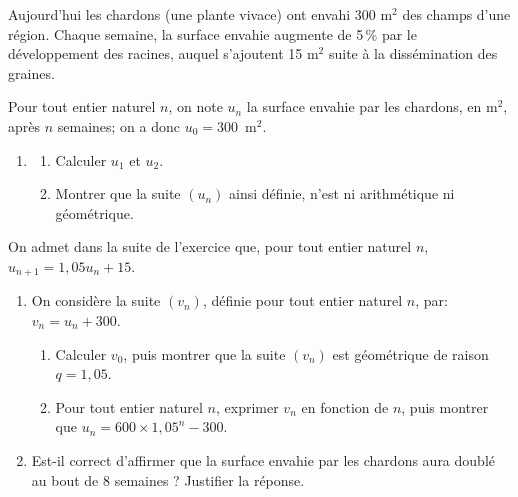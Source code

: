 \medskip

Aujourd'hui les chardons (une plante vivace) ont envahi 300 m$^2$ des champs d'une région.
 Chaque semaine, la surface envahie augmente de 5\,\% par le développement des racines, auquel s'ajoutent 15 m$^2$ suite à la dissémination des graines.
 
Pour tout entier naturel $n$, on note $u_n$ la surface envahie par les chardons, en m$^2$, après $n$ semaines; on a donc $u_0 = 300$~m$^2$.

\medskip

\begin{enumerate}
\item 
\begin{enumerate}
\item Calculer $u_1$ et $u_2$.
\item Montrer que la suite $\left(u_n\right)$ ainsi définie, n'est ni arithmétique ni géométrique.
\end{enumerate}
\end{enumerate}	

On admet dans la suite de l'exercice que, pour tout entier naturel $n$,\: $u_{n+1} = 1,05u_n + 15$.
\begin{enumerate}[resume]
\item On considère la suite $\left(v_n\right)$, définie pour tout entier naturel $n$, par: $v_n = u_n + 300$.
\begin{enumerate}
\item Calculer $v_0$, puis montrer que la suite $\left(v_n\right)$ est géométrique de raison $q = 1,05$.
\item Pour tout entier naturel $n$, exprimer $v_n$ en fonction de $n$, puis montrer que $u_n = 600 \times 1,05^n - 300$.
\end{enumerate}
\item Est-il correct d'affirmer que la surface envahie par les chardons aura doublé au bout de $8$ semaines ? Justifier la réponse.
\end{enumerate}

\bigskip
